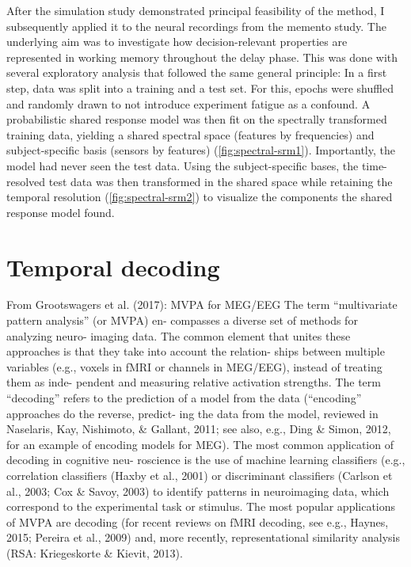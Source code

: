 After the simulation study demonstrated principal feasibility of the method, I subsequently applied it to the neural recordings from the memento study.
The underlying aim was to investigate how decision-relevant properties are represented in working memory throughout the delay phase.
This was done with several exploratory analysis that followed the same general principle:
In a first step, data was split into a training and a test set.
For this, epochs were shuffled and randomly drawn to not introduce experiment fatigue as a confound.
A probabilistic shared response model was then fit on the spectrally transformed training data, yielding a shared spectral space (features by frequencies) and subject-specific basis (sensors by features) (\ref{fig:spectral-srm1}).
Importantly, the model had never seen the test data.
Using the subject-specific bases, the time-resolved test data was then transformed in the shared space while retaining the temporal resolution (\ref{fig:spectral-srm2}) to visualize the components the shared response model found.





\pagebreak

\section{Temporal decoding}

From Grootswagers et al. (2017): MVPA for MEG/EEG
The term “multivariate pattern analysis” (or MVPA) en-
compasses a diverse set of methods for analyzing neuro-
imaging data. The common element that unites these
approaches is that they take into account the relation-
ships between multiple variables (e.g., voxels in fMRI or
channels in MEG/EEG), instead of treating them as inde-
pendent and measuring relative activation strengths. The
term “decoding” refers to the prediction of a model from
the data (“encoding” approaches do the reverse, predict-
ing the data from the model, reviewed in Naselaris, Kay,
Nishimoto, \& Gallant, 2011; see also, e.g., Ding \& Simon,
2012, for an example of encoding models for MEG). The
most common application of decoding in cognitive neu-
roscience is the use of machine learning classifiers (e.g.,
correlation classifiers (Haxby et al., 2001) or discriminant
classifiers (Carlson et al., 2003; Cox \& Savoy, 2003) to
identify patterns in neuroimaging data, which correspond
to the experimental task or stimulus. The most popular
applications of MVPA are decoding (for recent reviews on
fMRI decoding, see e.g., Haynes, 2015; Pereira et al., 2009)
and, more recently, representational similarity analysis
(RSA: Kriegeskorte \& Kievit, 2013).

